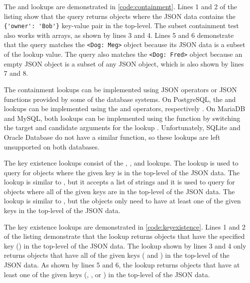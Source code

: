 The  and  lookups are demonstrated in
\autoref{code:containment}. Lines 1 and 2 of the listing show that the query
returns objects where the JSON data contains the \verb|{'owner': 'Bob'}|
key-value pair in the top-level. The subset containment test also works with
arrays, as shown by lines 3 and 4. Lines 5 and 6 demonstrate that the query
matches the \verb|<Dog: Meg>| object because its JSON data is a subset of the
lookup value. The query also matches the \verb|<Dog: Fred>| object because an
empty JSON object is a subset of any JSON object, which is also shown by lines
7 and 8.

The containment lookups can be implemented using JSON operators or JSON
functions provided by some of the database systems. On PostgreSQL, the
 and  lookups can be implemented using the
 and  operators, respectively \cite{postgres:json_operators}.
On MariaDB and MySQL, both lookups can be implemented using the
 function by switching the target and candidate arguments
for the  lookup \cite{mariadb:json_contains,
mysql:json_search}. Unfortunately, SQLite and Oracle Database do not have a
similar function, so these lookups are left unsupported on both databases.

\noindent
\begin{minipage}{\linewidth}

\end{minipage}

The key existence lookups consist of the , , and
 lookups. The  lookup is used to query for
objects where the given key is in the top-level of the JSON data. The
 lookup is similar to , but it accepts a list of
strings and it is used to query for objects where all of the given keys are
in the top-level of the JSON data. The  lookup is similar
to , but the objects only need to have at least one of the
given keys in the top-level of the JSON data.

The key existence lookups are demonstrated in \autoref{code:keyexistence}.
Lines 1 and 2 of the listing demonstrate that the  lookup
returns objects that have the specified key () in the top-level
of the JSON data. The  lookup shown by lines 3 and 4 only
returns objects that have all of the given keys ( and
) in the top-level of the JSON data. As shown by lines 5
and 6, the  lookup returns objects that have at least one
of the given keys (, , or ) in
the top-level of the JSON data.

